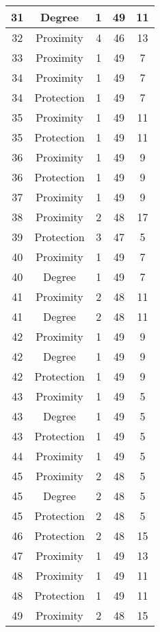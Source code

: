 \documentclass[results.tex]{subfiles}
\begin{document}
\begin{center}
\begin{tabular}{| c || c | c | c | c |}
    \hline
    31 & Degree & 1 & 49 & 11 \\ 
    \hline
    32 & Proximity & 4 & 46 & 13 \\ 
    \hline
    33 & Proximity & 1 & 49 & 7 \\ 
    \hline
    34 & Proximity & 1 & 49 & 7 \\ 
    \hline
    34 & Protection & 1 & 49 & 7 \\ 
    \hline
    35 & Proximity & 1 & 49 & 11 \\ 
    \hline
    35 & Protection & 1 & 49 & 11 \\ 
    \hline
    36 & Proximity & 1 & 49 & 9 \\ 
    \hline
    36 & Protection & 1 & 49 & 9 \\ 
    \hline
    37 & Proximity & 1 & 49 & 9 \\ 
    \hline
    38 & Proximity & 2 & 48 & 17 \\ 
    \hline
    39 & Protection & 3 & 47 & 5 \\ 
    \hline
    40 & Proximity & 1 & 49 & 7 \\ 
    \hline
    40 & Degree & 1 & 49 & 7 \\ 
    \hline
    41 & Proximity & 2 & 48 & 11 \\ 
    \hline
    41 & Degree & 2 & 48 & 11 \\ 
    \hline
    42 & Proximity & 1 & 49 & 9 \\ 
    \hline
    42 & Degree & 1 & 49 & 9 \\ 
    \hline
    42 & Protection & 1 & 49 & 9 \\ 
    \hline
    43 & Proximity & 1 & 49 & 5 \\ 
    \hline
    43 & Degree & 1 & 49 & 5 \\ 
    \hline
    43 & Protection & 1 & 49 & 5 \\ 
    \hline
    44 & Proximity & 1 & 49 & 5 \\ 
    \hline
    45 & Proximity & 2 & 48 & 5 \\ 
    \hline
    45 & Degree & 2 & 48 & 5 \\ 
    \hline
    45 & Protection & 2 & 48 & 5 \\ 
    \hline
    46 & Protection & 2 & 48 & 15 \\ 
    \hline
    47 & Proximity & 1 & 49 & 13 \\ 
    \hline
    48 & Proximity & 1 & 49 & 11 \\ 
    \hline
    48 & Protection & 1 & 49 & 11 \\ 
    \hline
    49 & Proximity & 2 & 48 & 15 \\ 
    \hline   \end{tabular}
\end{center}
\end{document}
